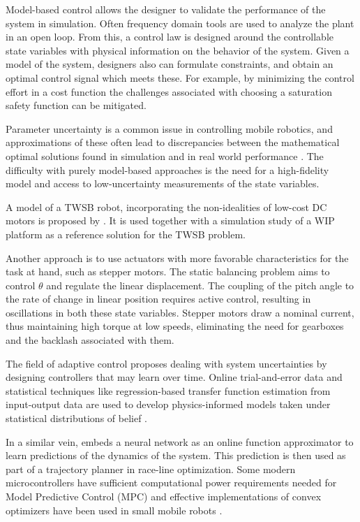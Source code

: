         Model-based control allows the designer to validate the performance of the system in simulation. 
        Often frequency domain tools are used to analyze the plant in an open loop. From this, a control law is designed around 
        the controllable state variables with physical information on the behavior of the system.
        Given a model of the system, designers also can formulate constraints, 
        and obtain an optimal control signal which meets these. For example, by minimizing the control effort in a cost function
        the challenges associated with choosing a saturation safety function can be mitigated.
        
        Parameter uncertainty is a common issue in controlling mobile robotics, and approximations of these often lead to 
        discrepancies between the mathematical optimal solutions found in simulation \cite{eide2011lqg} 
        and in real world performance \cite{tran2023fuzzy}. The difficulty with purely model-based approaches is
        the need for a high-fidelity model and access to low-uncertainty measurements of the state variables.
        
        A model of a TWSB robot, incorporating the non-idealities of low-cost DC motors is proposed by \cite{yamamoto2008nxtway}.
        It is used together with a simulation study of a WIP platform as a reference solution for the TWSB problem.
    
        Another approach is to use actuators with more favorable characteristics for the task at hand, such as stepper motors.
        The static balancing problem aims to control $\theta$ and regulate the linear displacement. The coupling of the 
        pitch angle to the rate of change in linear position requires active control, resulting in oscillations in both these state variables. 
        Stepper motors draw a nominal current, thus maintaining high torque at low speeds, eliminating the need for gearboxes and the 
        backlash associated with them. 
                
        The field of adaptive control proposes dealing with system uncertainties by designing controllers that may 
        learn over time. Online trial-and-error data and statistical techniques like regression-based transfer
        function estimation from input-output data are used to develop physics-informed models taken under statistical 
        distributions of belief \cite{benosman2018model}.         
                    
        In a similar vein, \cite{williams2016aggressive} embeds a neural network as an online function approximator to learn 
        predictions of the dynamics of the system. This prediction is then used as part of a trajectory planner in race-line optimization. 
        Some modern microcontrollers have sufficient computational power requirements needed for Model Predictive Control (MPC) and 
        effective implementations of convex optimizers \cite{nguyen2024tinympc} have been used in small mobile robots \cite{giernacki2017crazyflie}.
                
